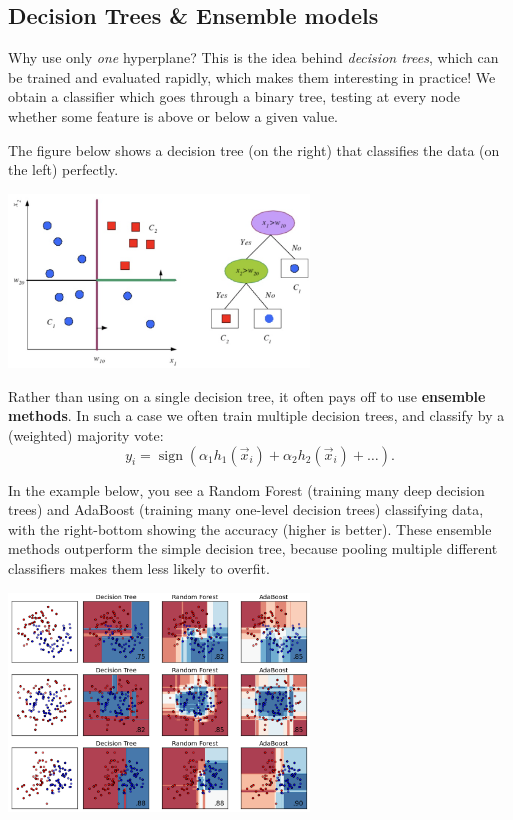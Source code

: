 \documentclass{article}
\DeclareMathOperator{\sign}{sign}
\begin{document}
\subsection{Decision Trees \& Ensemble models}
Why use only \textit{one} hyperplane? This is the idea behind \textit{decision trees}, which can be trained and evaluated rapidly, which makes them interesting in practice! We obtain a classifier which goes through a binary tree, testing at every node whether some feature is above or below a given value. 
\begin{testexample}
    The figure below shows a decision tree (on the right) that classifies the data (on the left) perfectly.
    \begin{center}\includegraphics[width=0.6\textwidth]{decisiontree.png}\end{center}
\end{testexample}
%
{\flushleft Rather} than using on a single decision tree, it often pays off to use \textbf{ensemble methods}. In such a case we often train multiple decision trees, and classify by a (weighted) majority vote:
\begin{equation}
    y_i = \sign( \alpha_1 h_1(\vec{x}_i) + \alpha_2h_2(\vec{x}_i) + \dots ).
\end{equation}
\begin{testexample}
    In the example below, you see a Random Forest (training many deep decision trees) and AdaBoost (training many one-level decision trees) classifying data, with the right-bottom showing the accuracy (higher is better). These ensemble methods outperform the simple decision tree, because pooling multiple different classifiers makes them less likely to overfit.
    \begin{center}\includegraphics[width=0.6\textwidth]{ml-classifiers.png}\end{center}
\end{testexample}
\end{document}
